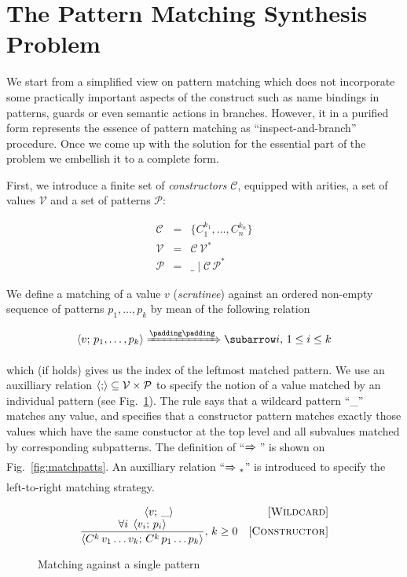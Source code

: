 \section{The Pattern Matching Synthesis Problem}

We start from a simplified view on pattern matching which does not incorporate some practically important aspects of the construct such as
name bindings in patterns, guards or even semantic actions in branches. However, it in a purified form represents the essence of pattern
matching as ``inspect-and-branch'' procedure. Once we come up with the solution for the essential part of the problem we embellish it to
a complete form.

First, we introduce a finite set of \emph{constructors} $\mathcal C$, equipped with arities, a set of values $\mathcal{V}$
and a set of patterns $\mathcal{P}$:
 
\[
 \begin{array}{rcll}
    \mathcal{C} & = & \{ C_1^{k_1}, \dots, C_n^{k_n} \}\\
    \mathcal{V} & = & \mathcal{C}\,\mathcal{V}^*\\  
    \mathcal{P} & = & \_ \mid \mathcal{C}\,\mathcal{P}^*
 \end{array}
\]

We define a matching of a value $v$ (\emph{scrutinee}) against an ordered non-empty sequence of patterns $p_1,\dots,p_k$ by mean of the following
relation

\[
\setarrow{\xRightarrow}
\trans{\inbr{v;\,p_1,\dots,p_k}}{}{i},\,1\le i\le k
\]

which (if holds) gives us the index of the leftmost matched pattern. We use an auxilliary relation $\left<{;}\right>\subseteq\mathcal{V}\times\mathcal{P}$
to specify the notion of a value matched by an individual pattern (see Fig.~\ref{fig:match1pat}). The rule  says that
a wildcard pattern ``\_'' matches any value, and  specifies that a constructor pattern matches exactly those values which
have the same constuctor at the top level and all subvalues matched by corresponding subpatterns. The definition of ``$\xRightarrow{}{}$'' is
shown on Fig.~\ref{fig:matchpatts}. An auxilliary relation ``$\xRightarrow{}{}_*$'' is introduced to specify the left-to-right matching strategy.

\begin{figure}
   \renewcommand*{\arraystretch}{2}
   \[
   \begin{array}{cr}
     \left<{v;\,\_}\right> & \mbox{[\textsc{Wildcard}]} \\
     \dfrac{\forall i\;\left<{v_i;\,p_i}\right>}{\left<{C^k\,v_1\dots v_k;\,C^k\,p_1\dots p_k}\right>},\,k\ge 0 & \mbox{[\textsc{Constructor}]}
   \end{array}
   \]
   \caption{Matching against a single pattern}
   \label{fig:match1pat}
\end{figure}

